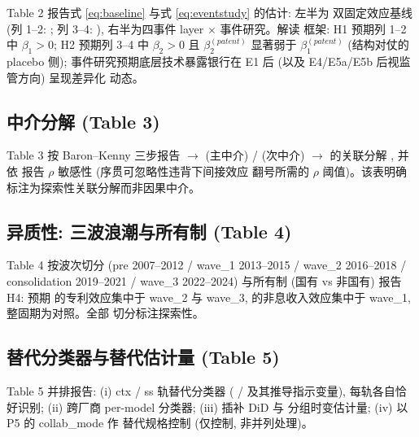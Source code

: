 Table 2 报告式 \eqref{eq:baseline} 与式 \eqref{eq:eventstudy} 的估计: 左半为
双固定效应基线 (列 1--2: ; 列 3--4:
), 右半为四事件 layer $\times$ 事件研究。解读
框架: H1 预期列 1--2 中 $\beta_1>0$; H2 预期列 3--4 中 $\beta_2>0$ 且
$\beta_2^{(patent)}$ 显著弱于 $\beta_1^{(patent)}$ (结构对仗的 placebo 侧);
事件研究预期底层技术暴露银行在 E1 后 (以及 E4/E5a/E5b 后视监管方向) 呈现差异化
动态。

\subsection{中介分解 (Table 3)}

Table 3 按 Baron--Kenny 三步报告  $\to$ 
(主中介) /  (次中介) $\to$
 的关联分解 \parencite{baron1986moderator},
并依 \textcite{imai2010general} 报告 $\rho$ 敏感性 (序贯可忽略性违背下间接效应
翻号所需的 $\rho$ 阈值)。该表明确标注为探索性关联分解而非因果中介。

\subsection{异质性: 三波浪潮与所有制 (Table 4)}

Table 4 按波次切分 (pre 2007--2012 / wave\_1 2013--2015 / wave\_2 2016--2018 /
consolidation 2019--2021 / wave\_3 2022--2024) 与所有制 (国有 vs 非国有) 报告
H4: 预期  的专利效应集中于 wave\_2 与 wave\_3,
 的非息收入效应集中于 wave\_1, 整固期为对照。全部
切分标注探索性。

\subsection{替代分类器与替代估计量 (Table 5)}

Table 5 并排报告: (i) ctx / ss 轨替代分类器 ( /
 及其推导指示变量), 每轨各自恰好识别; (ii) 跨厂商 per-model
分类器; (iii) \textcite{borusyak2024revisiting} 插补 DiD 与
\textcite{callaway2021difference} 分组时变估计量; (iv) 以 P5 的 collab\_mode 作
替代规格控制 (仅控制, 非并列处理)。

